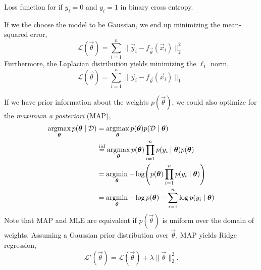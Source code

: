 \begin{marginfigure}[5cm]
    \centering
    \caption{Loss function for if $y_i = 0$ and $y_i = 1$ in binary cross entropy.}
    \label{fig:bce-loss}
\end{marginfigure}

If we the choose the model to be Gaussian, we end up minimizing the mean-squared error, \[
    \mathcal{L}(\vec{\theta}) = \sum_{i=1}^{n} \| \vec{y}_i - f_{\vec{\theta}}(\vec{x}_i) \|_2^2.
\]
Furthermore, the Laplacian distribution yields minimizing the $\ell_1$ norm, \[
    \mathcal{L}(\vec{\theta}) = \sum_{i=1}^{n} \| \vec{y}_i - f_{\vec{\theta}}(\vec{x}_i) \|_1.
\]

If we have prior information about the weights $p(\vec{\theta})$, we could also optimize for the
\textit{maximum a posteriori} (MAP),
\begin{align*}
    \argmax_{\vec{\theta}} p(\vec{\theta}\mid \mathcal{D}) & = \argmax_{\vec{\theta}} p(\vec{\theta}) p(\mathcal{D}\mid\vec{\theta})                                               \\
                                                           & \overset{\mathrm{iid}}{=} \argmax_{\vec{\theta}} p(\vec{\theta}) \prod_{i=1}^n p(y_i\mid\vec{\theta}) p(\vec{\theta}) \\
                                                           & = \argmin_{\vec{\theta}} -\log \lft( p(\vec{\theta}) \prod_{i=1}^n p(y_i\mid\vec{\theta}) \rgt)                       \\
                                                           & = \argmin_{\vec{\theta}} - \log p(\vec{\theta}) - \sum_{i=1}^{n} \log p(y_i\mid \vec{\theta})                         \\
\end{align*}
Note that MAP and MLE are equivalent if $p(\vec{\theta})$ is uniform over the domain of weights.
Assuming a Gaussian prior distribution over $\vec{\theta}$, MAP yields Ridge regression, \[
    \mathcal{L}'(\vec{\theta}) = \mathcal{L}(\vec{\theta}) + \lambda \| \vec{\theta} \|_2^2.
\]

